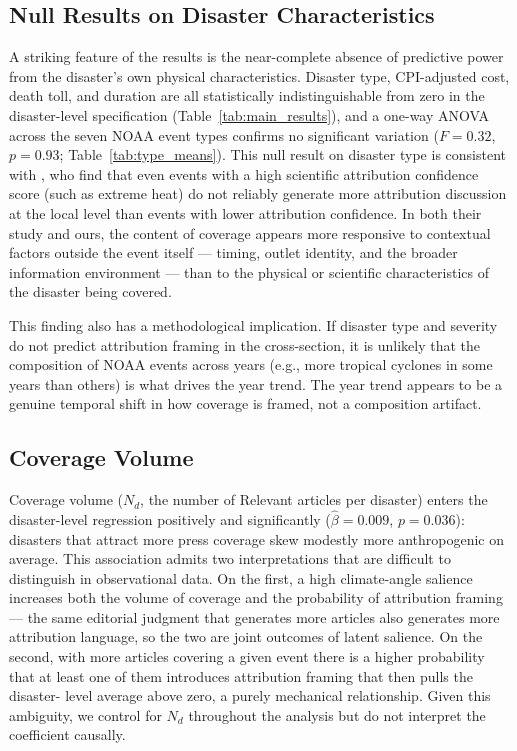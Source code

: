 \documentclass[12pt]{article}
\begin{document}
\subsection*{Null Results on Disaster Characteristics}

A striking feature of the results is the near-complete absence of
predictive power from the disaster's own physical characteristics.
Disaster type, CPI-adjusted cost, death toll, and duration are all
statistically indistinguishable from zero in the disaster-level
specification (Table~\ref{tab:main_results}), and a one-way ANOVA
across the seven NOAA event types confirms no significant variation
($F = 0.32$, $p = 0.93$; Table~\ref{tab:type_means}).  This null
result on disaster type is consistent with \citet{boudet2020}, who
find that even events with a high scientific attribution confidence
score (such as extreme heat) do not reliably generate more
attribution discussion at the local level than events with lower
attribution confidence.  In both their study and ours, the content of
coverage appears more responsive to contextual factors outside the
event itself --- timing, outlet identity, and the broader information
environment --- than to the physical or scientific characteristics of
the disaster being covered.

This finding also has a methodological implication.  If disaster type
and severity do not predict attribution framing in the cross-section,
it is unlikely that the composition of NOAA events across years (e.g.,
more tropical cyclones in some years than others) is what drives the
year trend.  The year trend appears to be a genuine temporal shift in
how coverage is framed, not a composition artifact.

\subsection*{Coverage Volume}

Coverage volume ($N_d$, the number of Relevant articles per disaster)
enters the disaster-level regression positively and significantly
($\hat\beta = 0.009$, $p = 0.036$): disasters that attract more press
coverage skew modestly more anthropogenic on average.  This
association admits two interpretations that are difficult to
distinguish in observational data.  On the first, a high climate-angle
salience increases both the volume of coverage and the probability of
attribution framing --- the same editorial judgment that generates more
articles also generates more attribution language, so the two are joint
outcomes of latent salience.  On the second, with more articles
covering a given event there is a higher probability that at least one
of them introduces attribution framing that then pulls the disaster-
level average above zero, a purely mechanical relationship.  Given this
ambiguity, we control for $N_d$ throughout the analysis but do not
interpret the coefficient causally.
\end{document}

